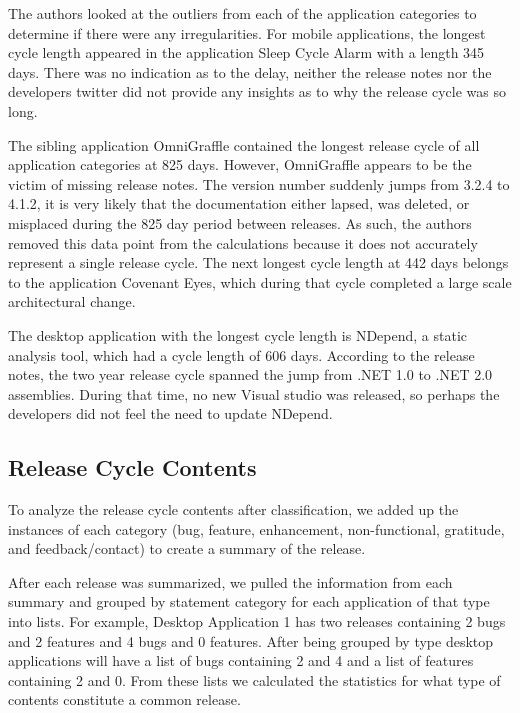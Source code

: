 \documentclass{acm_proc_article-sp}
\begin{document}
 The authors looked at the outliers from each of the application categories to determine if there were any irregularities.
For mobile applications, the longest cycle length appeared in the application Sleep Cycle Alarm with a length 345 days. 
There was no indication as to the delay, neither the release notes nor the developers twitter did not provide any insights as to why the release cycle was so long.

The sibling application OmniGraffle contained the longest release cycle of all application categories at 825 days. 
However, OmniGraffle appears to be the victim of missing release notes.
The version number suddenly jumps from 3.2.4 to 4.1.2, it is very likely that the documentation either lapsed, was deleted, or misplaced during the 825 day period between releases.
As such, the authors removed this data point from the calculations because it does not accurately represent a single release cycle. 
The next longest cycle length at 442 days belongs to the application Covenant Eyes, which during that cycle completed a large scale architectural change.

The desktop application with the longest cycle length is NDepend, a static analysis tool, which had a cycle length of 606 days. 
According to the release notes, the two year release cycle spanned the jump from .NET 1.0 to .NET 2.0 assemblies.
During that time, no new Visual studio was released, so perhaps the developers did not feel the need to update NDepend.


\subsection{Release Cycle Contents}

To analyze the release cycle contents after classification, we added up the instances of each category (bug, feature, enhancement, non-functional, gratitude, and feedback/contact) to create a summary of the release.

After each release was summarized, we pulled the information from each summary and grouped by statement category for each application of that type into lists. 
For example, Desktop Application 1 has two releases containing 2 bugs and 2 features and 4 bugs and 0 features. After being grouped by type desktop applications will have a list of bugs containing 2 and 4 and a list of features containing 2 and 0.
From these lists we calculated the statistics for what type of contents constitute a common release.
\end{document}
